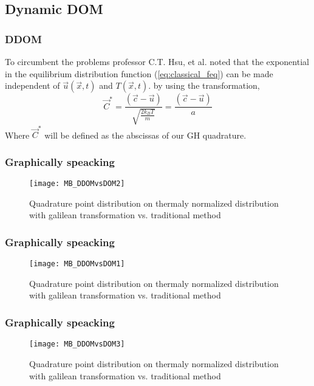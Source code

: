 \subsection{Dynamic DOM}
	
\begin{frame}
	\frametitle{DDOM}
	To circumbent the problems professor C.T. Hsu, et al. \cite{ISI:000303761300021,Hsu201239} noted that the exponential in the equilibrium distribution function (\ref{eq:classical_feq}) can be made independent of $\vec{u}(\vec{x},t)$ and $T(\vec{x},t)$. by using the transformation,
	\begin{equation}
	\vec{C}^{*}  = \frac{(\vec{c}-\vec{u})}{\sqrt{\frac{2 k_B T}{m}}} = \frac{(\vec{c}-\vec{u})}{a}
	\label{eq:transformation}
	\end{equation}
Where $\vec{C}^{*}$ will be defined as the abscissas of our GH quadrature.
\end{frame}

\begin{frame}
	\frametitle{Graphically speacking}
	
		\begin{figure}
			\centering
				\texttt{[image: MB\_DDOMvsDOM2]}
			\caption{Quadrature point distribution on thermaly normalized distribution with galilean transformation vs. traditional method}
			\label{fig:MB_DDOMvsDOM2}
		\end{figure}
	
\end{frame}

\begin{frame}
	\frametitle{Graphically speacking}
		
		\begin{figure}
			\centering
				\texttt{[image: MB\_DDOMvsDOM1]}
			\caption{Quadrature point distribution on thermaly normalized distribution with galilean transformation vs. traditional method}
			\label{fig:MB_DDOMvsDOM1}
		\end{figure}
		
\end{frame}

\begin{frame}
	\frametitle{Graphically speacking}

		\begin{figure}
			\centering
				\texttt{[image: MB\_DDOMvsDOM3]}
			\caption{Quadrature point distribution on thermaly normalized distribution with galilean transformation vs. traditional method}
			\label{fig:MB_DDOMvsDOM3}
		\end{figure}
		
\end{frame}



